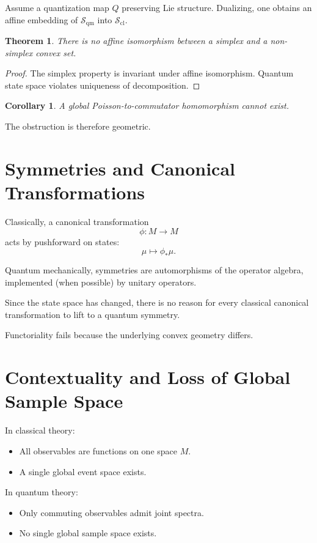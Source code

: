 \documentclass[11pt]{article}
\newtheorem{theorem}{Theorem}
\newtheorem{corollary}{Corollary}
\begin{document}
Assume a quantization map $Q$ preserving Lie structure.
Dualizing, one obtains an affine embedding of
$\mathcal{S}_{\mathrm{qm}}$ into $\mathcal{S}_{\mathrm{cl}}$.

\begin{theorem}
There is no affine isomorphism between a simplex and a non-simplex convex set.
\end{theorem}

\begin{proof}
The simplex property is invariant under affine isomorphism.
Quantum state space violates uniqueness of decomposition.
\end{proof}

\begin{corollary}
A global Poisson-to-commutator homomorphism cannot exist.
\end{corollary}

The obstruction is therefore geometric.

\section{Symmetries and Canonical Transformations}

Classically, a canonical transformation
\[
\phi: M \to M
\]
acts by pushforward on states:
\[
\mu \mapsto \phi_*\mu.
\]

Quantum mechanically, symmetries are automorphisms of the operator algebra,
implemented (when possible) by unitary operators.

Since the state space has changed,
there is no reason for every classical canonical transformation
to lift to a quantum symmetry.

Functoriality fails because the underlying convex geometry differs.

\section{Contextuality and Loss of Global Sample Space}

In classical theory:

\begin{itemize}
\item All observables are functions on one space $M$.
\item A single global event space exists.
\end{itemize}

In quantum theory:

\begin{itemize}
\item Only commuting observables admit joint spectra.
\item No single global sample space exists.
\end{itemize}
\end{document}
